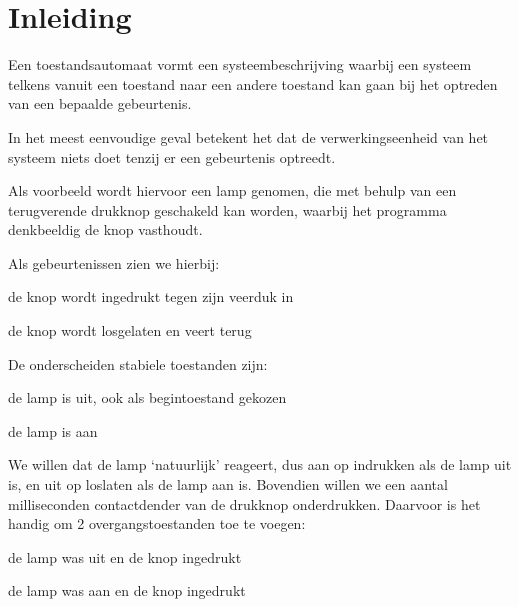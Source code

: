 \documentclass[a4paper, 11pt, fleqn, twoside]{scrartcl}%
\renewenvironment{description}[1][1em]%
 {\list{}{\labelwidth=0pt \leftmargin=#1
  \let\makelabel\descriptionlabel}}
 {\endlist}
\begin{document}
\pagestyle{RvLpagina}

\section{Inleiding}
Een toestandsautomaat vormt een systeembeschrijving waarbij een systeem
 telkens vanuit een toestand naar een andere toestand kan gaan bij het optreden
 van een bepaalde gebeurtenis.

In het meest eenvoudige geval betekent het dat de verwerkingseenheid van
 het systeem niets doet tenzij er een gebeurtenis optreedt.

Als voorbeeld wordt hiervoor een lamp genomen, die met behulp van een
 terugverende drukknop geschakeld kan worden, waarbij het programma denkbeeldig
 de knop vasthoudt.

Als gebeurtenissen zien we hierbij:
\begin{description}[1.2em]
\item[in] de knop wordt ingedrukt tegen zijn veerduk in
\item[los] de knop wordt losgelaten en veert terug
\end{description}

De onderscheiden stabiele toestanden zijn:
\begin{description}
\item[uit] de lamp is uit, ook als begintoestand gekozen
\item[aan] de lamp is aan
\end{description}

We willen dat de lamp `natuurlijk' reageert, dus aan op indrukken als de lamp
 uit is, en uit op loslaten als de lamp aan is. Bovendien willen we een 
 aantal milliseconden contactdender van de drukknop onderdrukken.
 Daarvoor is het handig om 2 overgangstoestanden toe te voegen:
\begin{description}
\item[aan1] de lamp was uit en de knop ingedrukt
\item[aan1] de lamp was aan en de knop ingedrukt
\end{description}
\end{document}
